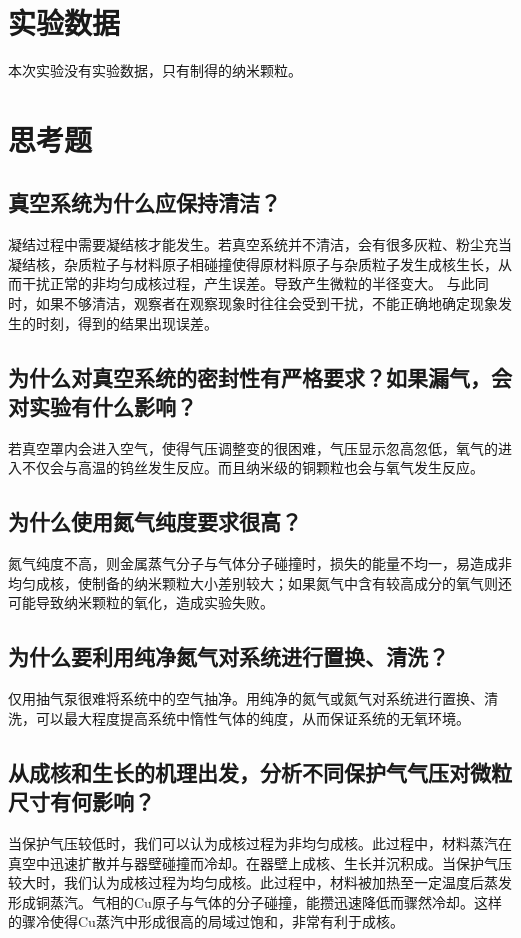 \documentclass[a4paper]{article}
\begin{document}
\section{实验数据}
本次实验没有实验数据，只有制得的纳米颗粒。

\section{思考题}
\subsection{真空系统为什么应保持清洁？}
凝结过程中需要凝结核才能发生。若真空系统并不清洁，会有很多灰粒、粉尘充当凝结核，杂质粒子与材料原子相碰撞使得原材料原子与杂质粒子发生成核生长，从而干扰正常的非均匀成核过程，产生误差。导致产生微粒的半径变大。
与此同时，如果不够清洁，观察者在观察现象时往往会受到干扰，不能正确地确定现象发生的时刻，得到的结果出现误差。
\subsection{为什么对真空系统的密封性有严格要求？如果漏气，会对实验有什么影响？}
若真空罩内会进入空气，使得气压调整变的很困难，气压显示忽高忽低，氧气的进入不仅会与高温的钨丝发生反应。而且纳米级的铜颗粒也会与氧气发生反应。
\subsection{为什么使用氮气纯度要求很高？}
氮气纯度不高，则金属蒸气分子与气体分子碰撞时，损失的能量不均一，易造成非均匀成核，使制备的纳米颗粒大小差别较大；如果氮气中含有较高成分的氧气则还可能导致纳米颗粒的氧化，造成实验失败。
\subsection{为什么要利用纯净氮气对系统进行置换、清洗？}
仅用抽气泵很难将系统中的空气抽净。用纯净的氮气或氮气对系统进行置换、清洗，可以最大程度提高系统中惰性气体的纯度，从而保证系统的无氧环境。
\subsection{从成核和生长的机理出发，分析不同保护气气压对微粒尺寸有何影响？}\label{section8.5}
当保护气压较低时，我们可以认为成核过程为非均匀成核。此过程中，材料蒸汽在真空中迅速扩散并与器壁碰撞而冷却。在器壁上成核、生长并沉积成。当保护气压较大时，我们认为成核过程为均匀成核。此过程中，材料被加热至一定温度后蒸发形成铜蒸汽。气相的Cu原子与气体的分子碰撞，能攒迅速降低而骤然冷却。这样的骤冷使得Cu蒸汽中形成很高的局域过饱和，非常有利于成核。
\end{document}
